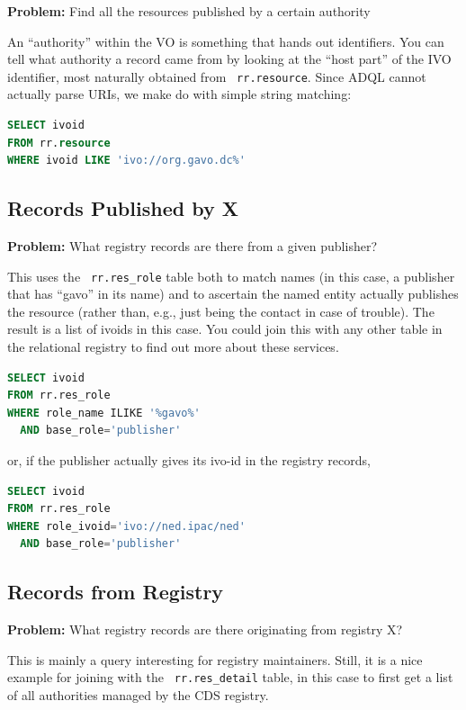 \documentclass[11pt,a4paper]{ivoa}
\newcommand{\rtent}[1]{\texttt{\color{rtcolor} #1}}
\begin{document}
\textbf{Problem:} Find all the resources published by a certain
authority

An ``authority'' within the VO is something that hands out identifiers.
You can tell what authority a record came from by looking at the ``host
part'' of the IVO identifier, most naturally obtained from 
\rtent{rr.resource}.  Since ADQL cannot actually parse
URIs, we make do with simple string matching:


\begin{lstlisting}[language=SQL,flexiblecolumns=true]
SELECT ivoid 
FROM rr.resource
WHERE ivoid LIKE 'ivo://org.gavo.dc%'
\end{lstlisting}

\subsection{Records Published by X}

\textbf{Problem:} What registry records are there from a given
publisher?

This uses the 
\rtent{rr.res\_role}
 table both to
match names (in this case, a publisher that has ``gavo'' in its name) and
to ascertain the named entity actually publishes the resource (rather
than, e.g., just being the contact in case of trouble).  The result is a
list of ivoids in this case.  You could join this with any other
table in the relational registry to find out more about these
services.


\begin{lstlisting}[language=SQL,flexiblecolumns=true]
SELECT ivoid 
FROM rr.res_role
WHERE role_name ILIKE '%gavo%'
  AND base_role='publisher'
\end{lstlisting}

or, if the publisher actually gives its ivo-id in the registry
records,


\begin{lstlisting}[language=SQL,flexiblecolumns=true]
SELECT ivoid 
FROM rr.res_role
WHERE role_ivoid='ivo://ned.ipac/ned'
  AND base_role='publisher'
\end{lstlisting}

\subsection{Records from Registry}

\textbf{Problem:} What registry records are
there originating from registry X?

This is mainly a query interesting for registry maintainers.  Still,
it is a nice example for joining with the
\rtent{rr.res\_detail} table, in this case to
first get a list of all authorities managed by the CDS registry.
\end{document}
